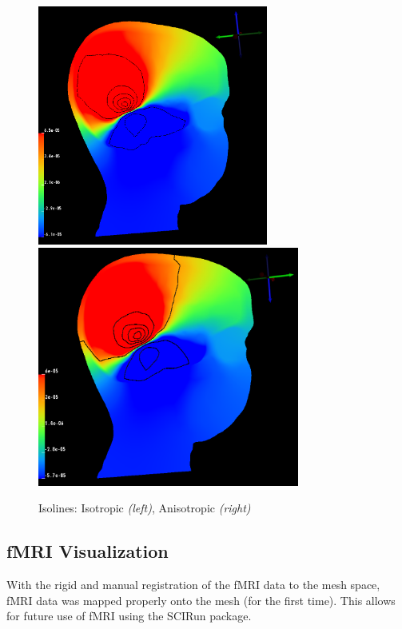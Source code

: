 \begin{figure}[H]
\begin{center}
\includegraphics[height=3.1in]{Figures/iso_isolines}
\includegraphics[height=3.1in]{Figures/aniso_isolines}
\caption{Isolines: Isotropic \textit{(left)}, Anisotropic \textit{(right)}}
\label{fig:isolines}
\end{center}
\end{figure}

\subsection{fMRI Visualization}

With the rigid and manual registration of the fMRI data to the mesh space, fMRI data was mapped properly onto the mesh (for the first time). This allows for future use of fMRI using the SCIRun package.

